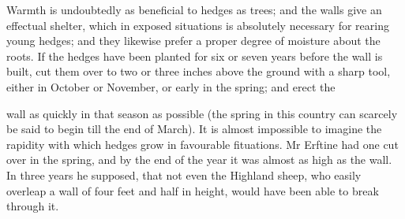 \documentclass{article}
\begin{document}
Warmth is undoubtedly as beneficial to hedges as trees; and the walls give an effectual shelter, which in exposed situations is absolutely necessary for rearing young hedges; and they likewise prefer a proper degree of moisture about the roots. If the hedges have been planted for six or seven years before the wall is built, cut them over to two or three inches above the ground with a sharp tool, either in October or November, or early in the spring; and erect the

wall as quickly in that season as possible (the spring in this country can scarcely be said to begin till the end of March). It is almost impossible to imagine the rapidity with which hedges grow in favourable fituations. Mr Erftine had one cut over in the spring, and by the end of the year it was almost as high as the wall. In three years he supposed, that not even the Highland sheep, who easily overleap a wall of four feet and half in height, would have been able to break through it.
\end{document}
